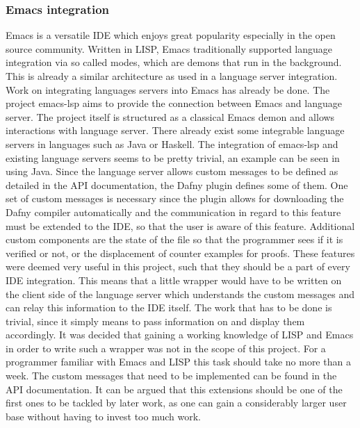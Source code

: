 \subsubsection{Emacs integration}
Emacs \cite{GNU} is a versatile IDE which enjoys great popularity especially in the open source community. Written in LISP, Emacs traditionally supported language integration via so called modes, which are demons that run in the background. This is already a similar architecture as used in a language server integration. \newline
Work on integrating languages servers into Emacs has already be done. The project emacs-lsp \cite{emacsLsp} aims to provide the connection between Emacs and language server. The project itself is structured as a classical Emacs demon and allows interactions with language server. There already exist some integrable language servers in languages such as Java or Haskell. The integration of emacs-lsp and existing language servers seems to be pretty trivial, an example can be seen in \cite{javaEmacs} using Java. \newline
Since the language server allows custom messages to be defined as detailed in the API documentation, the Dafny plugin defines some of them. One set of custom messages is necessary since the plugin allows for downloading the Dafny compiler automatically and the communication in regard to this feature must be extended to the IDE, so that the user is aware of this feature. Additional custom components are the state of the file so that the programmer sees if it is verified or not, or the displacement of counter examples for proofs.\newline
These features were deemed very useful in this project, such that they should be a part of every IDE integration. This means that a little wrapper would have to be written on the client side of the language server which understands the custom messages and can relay this information to the IDE itself. The work that has to be done is trivial, since it simply means to pass information on and display them accordingly. \newline
It was decided that gaining a working knowledge of LISP and Emacs in order to write such a wrapper was not in the scope of this project. For a programmer familiar with Emacs and LISP this task should take no more than a week. The custom messages that need to be implemented can be found in the API documentation. It can be argued that this extensions should be one of the first ones to be tackled by later work, as one can gain a considerably larger user base without having to invest too much work. 
